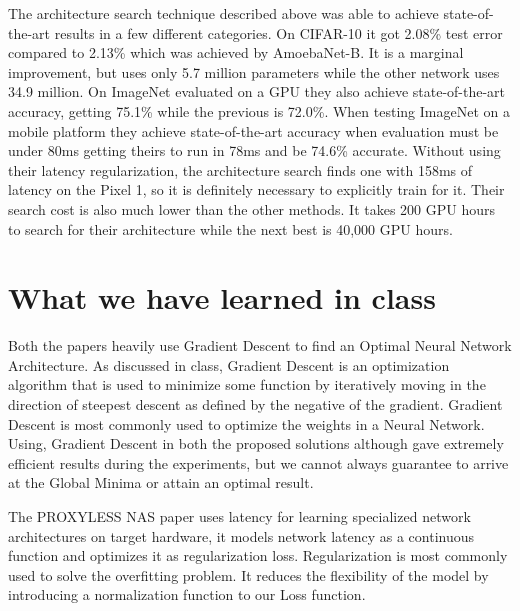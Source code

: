\documentclass{ieee}
\begin{document}
The architecture search technique described above was able to achieve state-of-the-art results in a few different categories. On CIFAR-10 it got 2.08\% test error compared to 2.13\% which was achieved by AmoebaNet-B. It is a marginal improvement, but uses only 5.7 million parameters while the other network uses 34.9 million. On ImageNet evaluated on a GPU they also achieve state-of-the-art accuracy, getting 75.1\% while the previous is 72.0\%. When testing ImageNet on a mobile platform they achieve state-of-the-art accuracy when evaluation must be under 80ms getting theirs to run in 78ms and be 74.6\% accurate. Without using their latency regularization, the architecture search finds one with 158ms of latency on the Pixel 1, so it is definitely necessary to explicitly train for it. Their search cost is also much lower than the other methods. It takes 200 GPU hours to search for their architecture while the next best is 40,000 GPU hours.\\

\section{What we have learned in class}
Both the papers heavily use Gradient Descent to find an Optimal Neural Network Architecture. As discussed in class, Gradient Descent is an optimization algorithm that is used to minimize some function by iteratively moving in the direction of steepest descent as defined by the negative of the gradient. Gradient Descent is most commonly used to optimize the weights in a Neural Network. 
Using, Gradient Descent in both the proposed solutions although gave extremely efficient results during the experiments, but we cannot always guarantee to arrive at the Global Minima or attain an optimal result.


The PROXYLESS NAS paper uses latency for learning specialized network architectures on target hardware, it models network latency as a continuous function and optimizes it as regularization loss. Regularization is most commonly used to solve the overfitting problem. It  reduces the flexibility of the model by introducing a normalization function to our Loss function.



 
\end{document}
